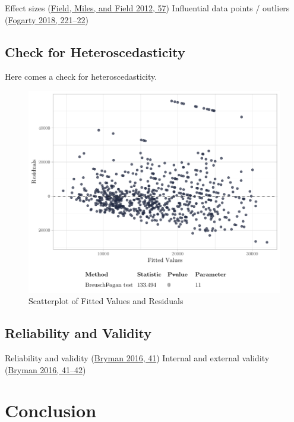 \documentclass[
]{article}
\begin{document}
Effect sizes (\protect\hyperlink{ref-field2012discovering}{Field, Miles,
and Field 2012, 57}) Influential data points / outliers
(\protect\hyperlink{ref-fogarty2018quantitative}{Fogarty 2018, 221--22})

\hypertarget{check-for-heteroscedasticity}{%
\subsection{Check for
Heteroscedasticity}\label{check-for-heteroscedasticity}}

Here comes a check for heteroscedasticity.

\begin{figure}[H]

{\centering \includegraphics[width=0.8\linewidth]{paper_files/figure-latex/unnamed-chunk-4-1} 

}

\caption{Scatterplot of Fitted Values and Residuals}\label{fig:unnamed-chunk-4}
\end{figure}

\hypertarget{reliability-and-validity}{%
\subsection{Reliability and Validity}\label{reliability-and-validity}}

Reliability and validity
(\protect\hyperlink{ref-bryman2016social}{Bryman 2016, 41}) Internal and
external validity (\protect\hyperlink{ref-bryman2016social}{Bryman 2016,
41--42})

\hypertarget{conclusion}{%
\section{Conclusion}\label{conclusion}}
\end{document}
